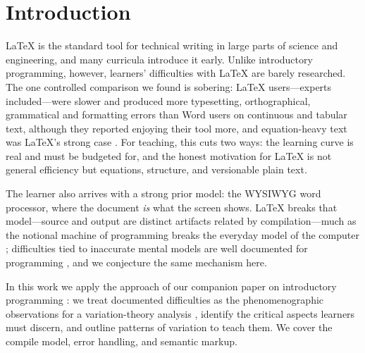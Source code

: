 \mode*
\section{Introduction}

LaTeX is the standard tool for technical writing in large parts of science
and engineering, and many curricula introduce it early.
Unlike introductory programming, however, learners' difficulties with
LaTeX are barely researched.
The one controlled comparison we found is sobering: LaTeX users---experts
included---were slower and produced more typesetting, orthographical,
grammatical and formatting errors than Word users on continuous and
tabular text, although they reported enjoying their tool more, and
equation-heavy text was LaTeX's strong case \autocite{Knauff2014Latex}.
For teaching, this cuts two ways: the learning curve is real and must be
budgeted for, and the honest motivation for LaTeX is not general
efficiency but equations, structure, and versionable plain text.


The learner also arrives with a strong prior model: the WYSIWYG word
processor, where the document \emph{is} what the screen shows.
LaTeX breaks that model---source and output are distinct artifacts related
by compilation---much as the notional machine of programming breaks the
everyday model of the computer
\autocite{Sorva2013NotionalMachines,DuBoulay1981BlackBox}; difficulties
tied to inaccurate mental models are well documented for programming
\autocite{QianLehman2017Misconceptions,BenAri1998Constructivism}, and we
conjecture the same mechanism here.

In this work we apply the approach of our companion paper on introductory
programming \autocite{VTProgMisconceptions}: we treat documented
difficulties as the phenomenographic observations for a variation-theory
analysis \autocite{NCOL}, identify the critical aspects learners must
discern, and outline patterns of variation to teach them.
We cover the compile model, error handling, and semantic markup.


